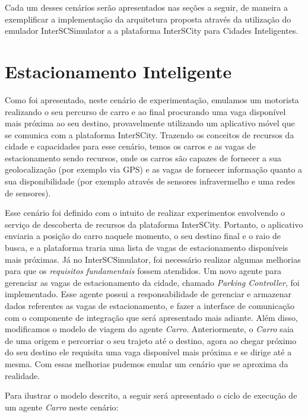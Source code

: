 Cada um desses cenários serão apresentados nas seções a seguir, de maneira a exemplificar a implementação da arquitetura proposta através da utilização do emulador
InterSCSimulator a a plataforma InterSCity para Cidades Inteligentes.

\section{Estacionamento Inteligente}

Como foi apresentado, neste cenário de experimentação, emulamos um motorista realizando o seu percurso de carro e ao final procurando uma vaga disponível mais próxima ao
seu destino, provavelmente utilizando um aplicativo móvel que se comunica com a plataforma InterSCity.
Trazendo os conceitos de recursos da cidade e capacidades para esse cenário, temos os carros e as vagas de estacionamento sendo recursos, onde os carros são capazes de
fornecer a sua geolocalização (por exemplo via GPS) e as vagas de fornecer informação quanto a sua disponibilidade (por exemplo através de sensores infravermelho e uma
redes de sensores).

Esse cenário foi definido com o intuito de realizar experimentos envolvendo o serviço de descoberta de recursos da plataforma InterSCity.
Portanto, o aplicativo enviaria a posição do carro naquele momento, o seu destino final e o raio de busca, e a plataforma traria uma lista de vagas de estacionamento
disponíveis mais próximas.
Já no InterSCSimulator, foi necessário realizar algumas melhorias para que os \textit{requisitos fundamentais} fossem atendidos.
Um novo agente para gerenciar as vagas de estacionamento da cidade, chamado \textit{Parking Controller}, foi implementado.
Esse agente possui a responsabilidade de gerenciar e armazenar dados referentes as vagas de estacionamento, e fazer a interface de comunicação com o componente de
integração que será apresentado mais adiante.
Além disso, modificamos o modelo de viagem do agente \textit{Carro}.
Anteriormente, o \textit{Carro} saia de uma origem e percorriar o seu trajeto até o destino, agora ao chegar próximo do seu destino ele requisita uma vaga disponível mais
próxima e se dirige até a mesma.
Com essas melhorias pudemos emular um cenário que se aproxima da realidade.

Para ilustrar o modelo descrito, a seguir será apresentado o ciclo de execução de um agente \textit{Carro} neste cenário:

